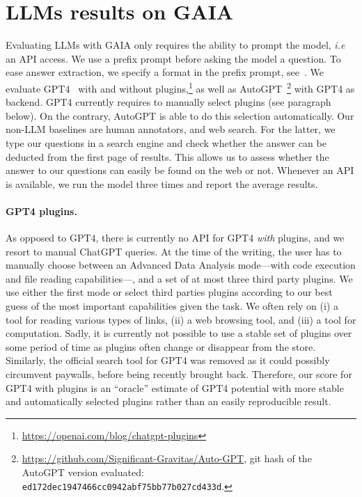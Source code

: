 \documentclass{fairmeta}
\newcommand{\benchmark}{\textsc{GAIA}}
\begin{document}
\section{LLMs results on GAIA}
\label{sec:evaluation}

\vspace{-.2cm}
Evaluating LLMs with \benchmark{} only requires the ability to prompt the model, \textit{i.e} an API access. We use a prefix prompt before asking the model a question. To ease answer extraction, we specify a format in the prefix prompt, see~. We evaluate GPT4~\citep{openai2023gpt4} with and without plugins,\footnote{\url{https://openai.com/blog/chatgpt-plugins}} as well as AutoGPT~\footnote{\url{https://github.com/Significant-Gravitas/Auto-GPT}, git hash of the AutoGPT version evaluated: \texttt{ed172dec1947466cc0942abf75bb77b027cd433d}.} with GPT4 as backend. GPT4 currently requires to manually select plugins (see paragraph below). On the contrary, AutoGPT is able to do this selection automatically. Our non-LLM baselines are human annotators, and web search. For the latter, we type our questions in a search engine and check whether the answer can be deducted from the first page of results. This allows us to assess whether the answer to our questions can easily be found on the web or not.
Whenever an API is available, we run the model three times and report the average results.

\vspace{-.2cm}

\paragraph{GPT4 plugins.} As opposed to GPT4, there is currently no API for GPT4 \textit{with} plugins, and we resort to manual ChatGPT queries. At the time of the writing, the user has to manually choose between an Advanced Data Analysis mode---with code execution and file reading capabilities---, and a set of at most three third party plugins. We use either the first mode or select third parties plugins according to our best guess of the most important capabilities given the task. We often rely on (i) a tool for reading various types of links, (ii) a web browsing tool, and (iii) a tool for computation. Sadly, it is currently not possible to use a stable set of plugins over some period of time as plugins often change or disappear from the store. Similarly, the official search tool for GPT4 was removed as it could possibly circumvent paywalls, before being recently brought back. Therefore, our score for GPT4 with plugins is an ``oracle'' estimate of GPT4 potential with more stable and automatically selected plugins rather than an easily reproducible result.
\end{document}

